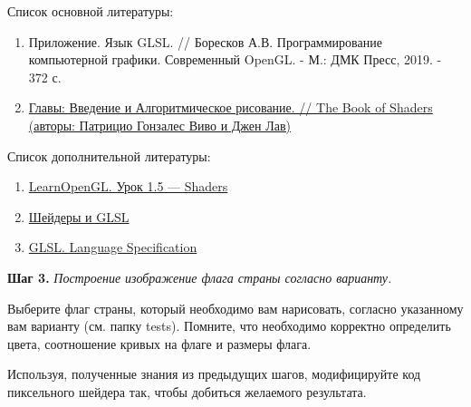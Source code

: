 \documentclass[a4paper,12pt]{article}
\theoremstyle{plain}
\begin{document}
    
    
    Список основной литературы:
    \begin{enumerate}
    \item 
    Приложение. Язык GLSL. // Боресков А.В. Программирование компьютерной графики. Современный OpenGL. - М.: ДМК Пресс, 2019. - 372 с.
    \item 
    \href{https://thebookofshaders.com/?lan=ru}{Главы: Введение и Алгоритмическое рисование. // The Book of Shaders (авторы: Патрицио Гонзалес Виво и Джен Лав)} 
    
    \end{enumerate}
    
    
    Список дополнительной литературы:
    \begin{enumerate}
    
    \item 
    \href{https://habr.com/ru/post/313380/
    }{LearnOpenGL. Урок 1.5 — Shaders}
    
    \item \href{https://webglfundamentals.org/webgl/lessons/ru/webgl-shaders-and-glsl.html}{Шейдеры и GLSL}
    
    \item 
    \href{https://www.khronos.org/registry/OpenGL/specs/gl/}{GLSL. Language Specification}
    
\end{enumerate}
    
    \textbf{Шаг 3.} \textit{Построение изображение флага страны согласно варианту.}
    
    Выберите флаг страны, который необходимо вам нарисовать, согласно указанному вам варианту (см. папку tests). Помните, что необходимо корректно определить цвета, соотношение кривых на флаге и размеры флага.
    
    Используя, полученные знания из предыдущих шагов, модифицируйте код пиксельного шейдера так, чтобы добиться желаемого результата.
\end{document}
